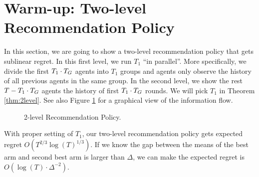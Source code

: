 \section{Warm-up: Two-level Recommendation Policy}
In this section, we are going to show a two-level recommendation policy that gets sublinear regret.
In this first level, we run $T_1$ \ALGG ``in parallel''. More specifically, we divide the first $T_1 \cdot T_G$ agents into $T_1$ groups and agents only observe the history of all previous agents in the same group.
In the second level, we show the rest $T-T_1\cdot T_G$ agents the history of first $T_1 \cdot T_G$ rounds. We will pick $T_1$ in Theorem \ref{thm:2level}. 
See also Figure \ref{fig:2level} for a graphical view of the information flow.

\begin{figure}[H]
\centering
{}
\caption{2-level Recommendation Policy.}
\label{fig:2level}
\end{figure}

\begin{theorem}
\label{thm:2level}
With proper setting of $T_1$, our two-level recommendation policy gets expected regret $O(T^{2/3} \log(T)^{1/3})$. If we know the gap between the means of the best arm and second best arm is larger than $\Delta$, we can make the expected regret is $O(\log(T) \cdot \Delta^{-2})$. 
\end{theorem}

